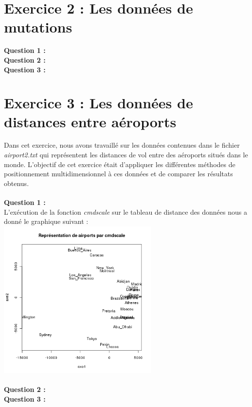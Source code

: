\documentclass[a4paper, 10pt]{article}
\begin{document}
\section*{Exercice 2 : Les données de mutations}
\textbf{Question 1 :}\\
\textbf{Question 2 :}\\
\textbf{Question 3 :}\\

\section*{Exercice 3 : Les données de distances entre aéroports}
Dans cet exercice, nous avons travaillé sur les données contenues dans le fichier \textit{airport2.txt} qui représentent les distances de vol
entre des aéroports situés dans le monde. L'objectif de cet exercice était d'appliquer les différentes méthodes
de positionnement multidimensionnel à ces données et de comparer les résultats obtenus.\\ \\
\textbf{Question 1 :}\\
L'exécution de la fonction \textit{cmdscale} sur le tableau de distance des données nous a donné le graphique suivant :\\
\includegraphics[height = 8cm, width = 8cm]{plots/plot_airports_cmdscale.png}\\ \\
\textbf{Question 2 :}\\
\textbf{Question 3 :}\\
\end{document}
